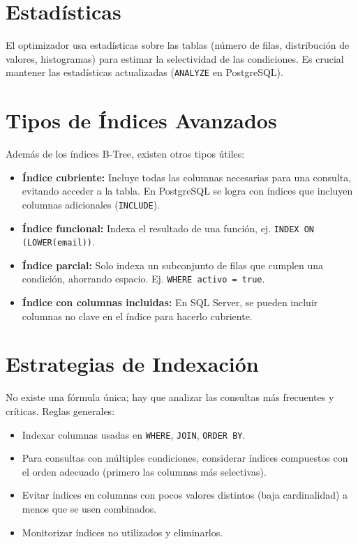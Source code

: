 \documentclass[12pt,a4paper,openany,oneside]{book}
\begin{document}
\section{Estadísticas}
El optimizador usa estadísticas sobre las tablas (número de filas, distribución de valores, histogramas) para estimar la selectividad de las condiciones. Es crucial mantener las estadísticas actualizadas (\texttt{ANALYZE} en PostgreSQL).

\section{Tipos de Índices Avanzados}
Además de los índices B-Tree, existen otros tipos útiles:
\begin{itemize}
    \item \textbf{Índice cubriente:} Incluye todas las columnas necesarias para una consulta, evitando acceder a la tabla. En PostgreSQL se logra con índices que incluyen columnas adicionales (\texttt{INCLUDE}).
    \item \textbf{Índice funcional:} Indexa el resultado de una función, ej. \texttt{INDEX ON (LOWER(email))}.
    \item \textbf{Índice parcial:} Solo indexa un subconjunto de filas que cumplen una condición, ahorrando espacio. Ej. \texttt{WHERE activo = true}.
    \item \textbf{Índice con columnas incluidas:} En SQL Server, se pueden incluir columnas no clave en el índice para hacerlo cubriente.
\end{itemize}

\section{Estrategias de Indexación}
No existe una fórmula única; hay que analizar las consultas más frecuentes y críticas. Reglas generales:
\begin{itemize}
    \item Indexar columnas usadas en \texttt{WHERE}, \texttt{JOIN}, \texttt{ORDER BY}.
    \item Para consultas con múltiples condiciones, considerar índices compuestos con el orden adecuado (primero las columnas más selectivas).
    \item Evitar índices en columnas con pocos valores distintos (baja cardinalidad) a menos que se usen combinados.
    \item Monitorizar índices no utilizados y eliminarlos.
\end{itemize}
\end{document}
